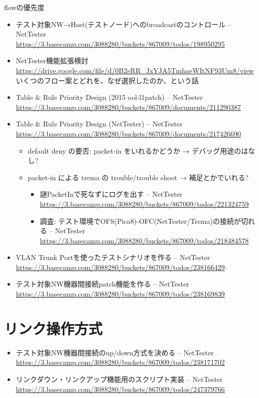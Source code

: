 flowの優先度
\begin{itemize}
 \item テスト対象NW→Host(テストノード)へのbroadcastのコントロール – NetTester \url{https://3.basecamp.com/3088280/buckets/867009/todos/198950295}
 \item NetTester機能拡張検討
       \url{https://drive.google.com/file/d/0B2eRR_JxYJA5TmhaeWItNF93Um8/view}
       いくつのフロー案とどれを、なぜ選択したのか、という話
 \item Table \& Rule Priority Design (2015 ool-l1patch) – NetTester \url{https://3.basecamp.com/3088280/buckets/867009/documents/211290387}
 \item Table \& Rule Priority Design (NetTester) – NetTester \url{https://3.basecamp.com/3088280/buckets/867009/documents/217426690}
       \begin{itemize}
        \item default deny の要否: packet-in をいれるかどうか → デバッグ用途のはなし?
        \item packet-in による trema の trouble/trouble shoot → 補足とかでいれる?
              \begin{itemize}
               \item 謎PacketInで死なずにログを出す – NetTester \url{https://3.basecamp.com/3088280/buckets/867009/todos/221324759}
               \item 調査: テスト環境でOFS(Pica8)-OFC(NetTester/Trema)の接続が切れる – NetTester \url{https://3.basecamp.com/3088280/buckets/867009/todos/218484578}
              \end{itemize}
       \end{itemize}
 \item VLAN Trunk Portを使ったテストシナリオを作る – NetTester \url{https://3.basecamp.com/3088280/buckets/867009/todos/238166429}
 \item テスト対象NW機器間接続patch機能を作る – NetTester \url{https://3.basecamp.com/3088280/buckets/867009/todos/238169839}
\end{itemize}

\section{リンク操作方式}

\begin{itemize}
 \item テスト対象NW機器間接続のup/down方式を決める – NetTester \url{https://3.basecamp.com/3088280/buckets/867009/todos/238171702}
 \item リンクダウン・リンクアップ機能用のスクリプト実装 – NetTester \url{https://3.basecamp.com/3088280/buckets/867009/todos/247379766}
\end{itemize}

